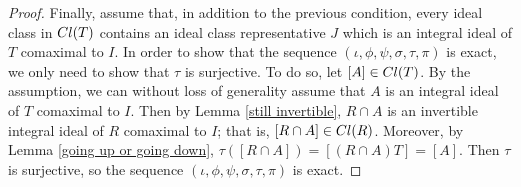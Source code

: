 \documentclass[10pt,a4paper]{amsart}
\newcommand{\Cl}{\textup{Cl}}
\begin{document}
\begin{proof}
    Finally, assume that, in addition to the previous condition, every ideal class in $\Cl(T)$ contains an ideal class representative $J$ which is an integral ideal of $T$ comaximal to $I$. In order to show that the sequence $(\iota,\phi,\psi,\sigma,\tau,\pi)$ is exact, we only need to show that $\tau$ is surjective. To do so, let $[A]\in\Cl(T)$. By the assumption, we can without loss of generality assume that $A$ is an integral ideal of $T$ comaximal to $I$. Then by Lemma \ref{still invertible}, $R\cap A$ is an invertible integral ideal of $R$ comaximal to $I$; that is, $[R\cap A]\in \Cl(R)$. Moreover, by Lemma \ref{going up or going down}, $\tau([R\cap A])=[(R\cap A)T]=[A]$. Then $\tau$ is surjective, so the sequence $(\iota,\phi,\psi,\sigma,\tau,\pi)$ is exact.
\end{proof}
\end{document}
